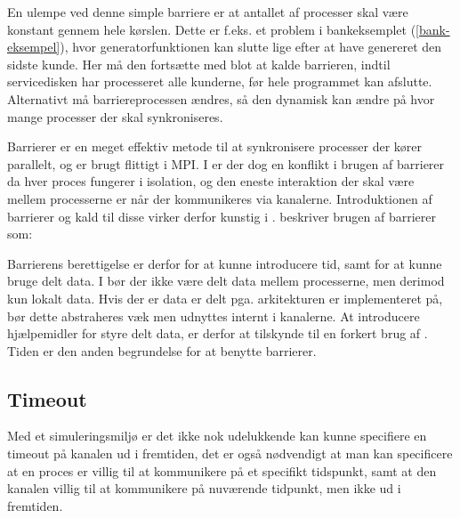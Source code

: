 En ulempe ved denne simple barriere er at antallet af processer skal være 
konstant gennem hele kørslen.
Dette er f.eks. et problem i bankeksemplet (\cref{bank-eksempel}), hvor 
generatorfunktionen kan slutte lige efter at have genereret den sidste kunde.  
Her må den fortsætte med blot at kalde barrieren, indtil servicedisken har 
processeret alle kunderne, før hele programmet kan afslutte. Alternativt må 
barriereprocessen ændres, så den dynamisk kan ændre på hvor mange processer der 
skal synkroniseres. 


Barrierer er en meget effektiv metode til at synkronisere processer der kører 
parallelt, og er brugt flittigt i MPI. I \csp er der dog en konflikt i brugen 
af barrierer da hver proces fungerer i isolation, og den eneste interaktion der 
skal være mellem processerne er når der kommunikeres via kanalerne. 
Introduktionen af barrierer og kald til disse virker derfor kunstig i \csp. 
\citeauthor{crew} beskriver brugen af barrierer som:


Barrierens berettigelse er derfor for at kunne introducere tid, samt for at kunne bruge delt data. I \csp bør der ikke være delt data mellem processerne, men derimod kun  lokalt data. Hvis der er data er delt pga. arkitekturen \csp er implementeret på, bør dette abstraheres væk men udnyttes internt i kanalerne. At introducere hjælpemidler for styre delt data, er derfor at tilskynde til en forkert brug af \csp. Tiden er den anden begrundelse for at benytte barrierer.


\subsection{Timeout} 
Med et simuleringsmiljø er det ikke nok
udelukkende kan kunne specifiere en timeout på kanalen ud i fremtiden,
det er også nødvendigt at man kan specificere at en proces er villig
til at kommunikere på et specifikt tidspunkt, samt at den kanalen
villig til at kommunikere på nuværende tidpunkt, men ikke ud i
fremtiden.

